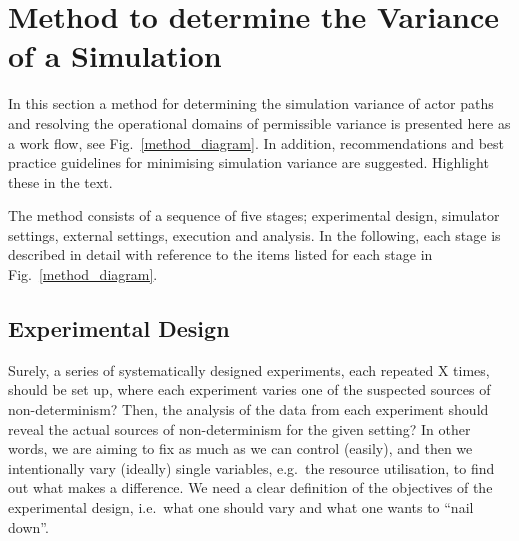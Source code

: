 \documentclass[letterpaper, 10 pt, journal, twoside]{IEEEtran}
\begin{document}
\section{Method to determine the Variance of a Simulation} \label{s:methodology}
%
In this section a method for determining the simulation variance of actor paths and resolving the operational domains of permissible variance is presented here as a work flow, see Fig.~\ref{method_diagram}.
%
In addition, recommendations and best practice guidelines for minimising simulation variance are suggested.
{\color{red} \sc Highlight these in the text.}
%

The method consists of a sequence of five stages; experimental design, simulator settings, external settings, execution and analysis. In the following, each stage is described in detail with reference to the items listed for each stage in Fig.~\ref{method_diagram}.

\subsection{Experimental Design}\label{s:design_experiment}

{\color{red} \sc Surely, a series of systematically designed experiments, each repeated X times, should be set up, where each experiment varies one of the suspected sources of non-determinism? Then, the analysis of the data from each experiment should reveal the actual sources of non-determinism for the given setting? In other words, we are aiming to fix as much as we can control (easily), and then we intentionally vary (ideally) single variables, e.g.\ the resource utilisation, to find out what makes a difference. We need a clear definition of the objectives of the experimental design, i.e.\ what one should vary and what one wants to ``nail down''.}
\end{document}
